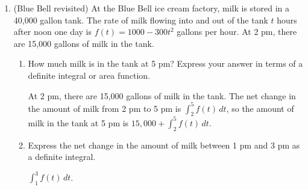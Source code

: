 \documentclass[main]{subfiles}
\begin{document}
\begin{enumerate}
\item 

  (Blue Bell revisited) At the Blue Bell ice cream factory, milk is stored
  in a 40,000 gallon tank.  The rate of milk flowing into and out of the
  tank $t$ hours after noon one day is $f(t) = 1000 - 300 t^2$ gallons per
  hour.  At 2 pm, there are 15,000 gallons of milk in the tank.
  \begin{enumerate}

  \item


    \begin{problem}[0.35in]
      How much milk is in the tank at 5 pm?  Express your answer in terms
      of a definite integral or area function.
    \end{problem}

    \begin{solution}
      At 2 pm, there are 15,000 gallons of milk in the tank.  The net
      change in the amount of milk from 2 pm to 5 pm is $\displaystyle
      \int_2^5 f(t)\,dt$, so the amount of milk in the tank at 5 pm is
      $\boxed{15,000 + \int_2^5 f(t)\,dt}$.
    \end{solution}

  \item


    \begin{problem}[0.35in]
      Express the net change in the amount of milk between 1 pm and 3 pm
      as a definite integral.
    \end{problem}

    \begin{solution}
      $\displaystyle \int_1^3 f(t)\,dt$.
    \end{solution}


\end{enumerate}
\end{enumerate}
\end{document}
